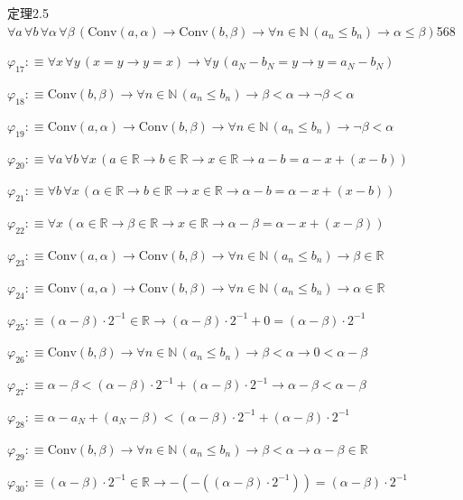 \begin{fullproof}{定理2.5}{$\forall a\,\forall b\,\forall \alpha\,\forall \beta\,(\mathrm{Conv}(a,\alpha) \to \mathrm{Conv}(b,\beta) \to \forall n \in \mathbb{N}\,(a_{n} \leq b_{n}) \to \alpha \leq \beta)$}{568}
\begin{abbrevlist}
\item $\varphi_{17} :\equiv \forall x\,\forall y\,(x = y \to y = x) \to \forall y\,(a_{N} - b_{N} = y \to y = a_{N} - b_{N})$
\item $\varphi_{18} :\equiv \mathrm{Conv}(b,\beta) \to \forall n \in \mathbb{N}\,(a_{n} \leq b_{n}) \to \beta < \alpha \to \neg \beta < \alpha$
\item $\varphi_{19} :\equiv \mathrm{Conv}(a,\alpha) \to \mathrm{Conv}(b,\beta) \to \forall n \in \mathbb{N}\,(a_{n} \leq b_{n}) \to \neg \beta < \alpha$
\item $\varphi_{20} :\equiv \forall a\,\forall b\,\forall x\,(a \in \mathbb{R} \to b \in \mathbb{R} \to x \in \mathbb{R} \to a - b = a - x + (x - b))$
\item $\varphi_{21} :\equiv \forall b\,\forall x\,(\alpha \in \mathbb{R} \to b \in \mathbb{R} \to x \in \mathbb{R} \to \alpha - b = \alpha - x + (x - b))$
\item $\varphi_{22} :\equiv \forall x\,(\alpha \in \mathbb{R} \to \beta \in \mathbb{R} \to x \in \mathbb{R} \to \alpha - \beta = \alpha - x + (x - \beta))$
\item $\varphi_{23} :\equiv \mathrm{Conv}(a,\alpha) \to \mathrm{Conv}(b,\beta) \to \forall n \in \mathbb{N}\,(a_{n} \leq b_{n}) \to \beta \in \mathbb{R}$
\item $\varphi_{24} :\equiv \mathrm{Conv}(a,\alpha) \to \mathrm{Conv}(b,\beta) \to \forall n \in \mathbb{N}\,(a_{n} \leq b_{n}) \to \alpha \in \mathbb{R}$
\item $\varphi_{25} :\equiv (\alpha - \beta) \cdot 2^{-1} \in \mathbb{R} \to (\alpha - \beta) \cdot 2^{-1} + 0 = (\alpha - \beta) \cdot 2^{-1}$
\item $\varphi_{26} :\equiv \mathrm{Conv}(b,\beta) \to \forall n \in \mathbb{N}\,(a_{n} \leq b_{n}) \to \beta < \alpha \to 0 < \alpha - \beta$
\item $\varphi_{27} :\equiv \alpha - \beta < (\alpha - \beta) \cdot 2^{-1} + (\alpha - \beta) \cdot 2^{-1} \to \alpha - \beta < \alpha - \beta$
\item $\varphi_{28} :\equiv \alpha - a_{N} + (a_{N} - \beta) < (\alpha - \beta) \cdot 2^{-1} + (\alpha - \beta) \cdot 2^{-1}$
\item $\varphi_{29} :\equiv \mathrm{Conv}(b,\beta) \to \forall n \in \mathbb{N}\,(a_{n} \leq b_{n}) \to \beta < \alpha \to \alpha - \beta \in \mathbb{R}$
\item $\varphi_{30} :\equiv (\alpha - \beta) \cdot 2^{-1} \in \mathbb{R} \to -(-((\alpha - \beta) \cdot 2^{-1})) = (\alpha - \beta) \cdot 2^{-1}$

\end{abbrevlist}
\end{fullproof}
